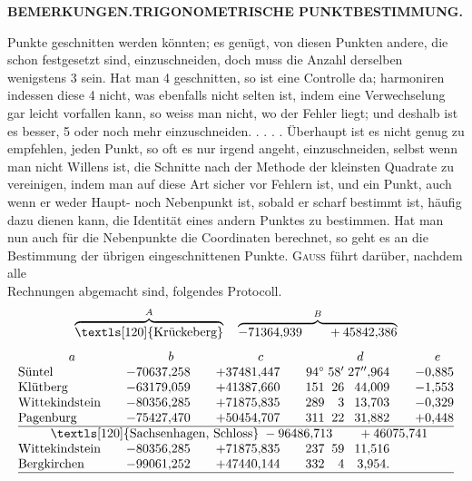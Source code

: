 \par\clearpage
\noindent{}\hfill{\small\textbf{BEMERKUNGEN.\quad TRIGONOMETRISCHE PUNKTBESTIMMUNG.}}\hfill\null\par\medskip

{\small
\noindent Punkte geschnitten werden könnten; es genügt, von diesen Punkten andere, die schon festgesetzt sind, einzuschneiden, doch muss die Anzahl derselben wenigstens 3 sein. Hat man 4 geschnitten, so ist eine Controlle da; harmoniren indessen diese 4 nicht, was ebenfalls nicht selten ist, indem eine Verwechselung gar leicht vorfallen kann, so weiss man nicht, wo der Fehler liegt; und deshalb ist es besser, 5 oder noch mehr einzuschneiden. . . . . Überhaupt ist es nicht genug zu empfehlen, jeden Punkt, so oft es nur irgend angeht, einzuschneiden, selbst wenn man nicht Willens ist, die Schnitte nach der Methode der kleinsten Quadrate zu vereinigen, indem man auf diese Art sicher vor Fehlern ist, und ein Punkt, auch wenn er weder Haupt- noch Nebenpunkt ist, sobald er scharf bestimmt ist, häufig dazu dienen kann, die Identität eines andern Punktes zu bestimmen. Hat man nun auch für die Nebenpunkte die Coordinaten berechnet, so geht es an die Bestimmung der übrigen eingeschnittenen Punkte. \textsc{Gauss} führt darüber, nachdem alle\\
Rechnungen abgemacht sind, folgendes Protocoll.
\[
 \overbrace{\text{\textls[120]{Krückeberg}}}^{A}
 \quad\overbrace{-71364{,}939\qquad+45842{,}386}^{B}
\]
\[
\begin{array}{@{}l@{\qquad}r@{\qquad}r@{\qquad}r@{\;}r@{\;}r@{\qquad}r@{}}
 \multicolumn{1}{c}{a}&\multicolumn{1}{c}{b}&\multicolumn{1}{c}{c}&
 \multicolumn{3}{c}{d}&\multicolumn{1}{c@{}}{e}\\
 \text{Süntel}&-70637{,}258&+37481{,}447&94^\circ&58'&27''{,}964&-0{,}885\\
 \text{Klütberg}&-63179{,}059&+41387{,}660&151&26&44{,}009&-1{,}553\\
 \text{Wittekindstein}&-80356{,}285&+71875{,}835&289&3&13{,}703&-0{,}329\\
 \text{Pagenburg}&-75427{,}470&+50454{,}707&311&22&31{,}882&+0{,}448\\
 \hline
 \multicolumn{7}{c@{}}{\text{\textls[120]{Sachsenhagen, Schloss}}\;-96486{,}713\qquad+46075{,}741}\\
 \text{Wittekindstein}&-80356{,}285&+71875{,}835&237&59&11{,}516&\\
 \text{Bergkirchen}&-99061{,}252&+47440{,}144&332&4&3{,}954.&\\
 \hline
\end{array}
\]

}
